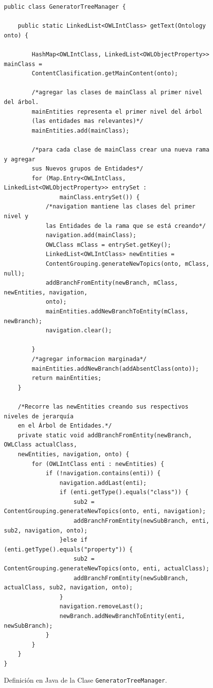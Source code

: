 \begin{figure}
\begin{verbatim}
public class GeneratorTreeManager {

    public static LinkedList<OWLIntClass> getText(Ontology onto) {

        HashMap<OWLIntClass, LinkedList<OWLObjectProperty>> mainClass =
        ContentClasification.getMainContent(onto);
        
        /*agregar las clases de mainClass al primer nivel del árbol. 
        mainEntities representa el primer nivel del árbol 
        (las entidades mas relevantes)*/
        mainEntities.add(mainClass);
        
        /*para cada clase de mainClass crear una nueva rama y agregar 
        sus Nuevos grupos de Entidades*/
        for (Map.Entry<OWLIntClass, LinkedList<OWLObjectProperty>> entrySet : 
                mainClass.entrySet()) {
            /*navigation mantiene las clases del primer nivel y
            las Entidades de la rama que se está creando*/
            navigation.add(mainClass);
            OWLClass mClass = entrySet.getKey();
            LinkedList<OWLIntClass> newEntities =
            ContentGrouping.generateNewTopics(onto, mClass, null);
            addBranchFromEntity(newBranch, mClass, newEntities, navigation,
            onto);
            mainEntities.addNewBranchToEntity(mClass, newBranch);
            navigation.clear();
            
        }
        /*agregar informacion marginada*/
        mainEntities.addNewBranch(addAbsentClass(onto));
        return mainEntities;
    }
    
    /*Recorre las newEntities creando sus respectivos niveles de jerarquía 
    en el Árbol de Entidades.*/
    private static void addBranchFromEntity(newBranch, OWLClass actualClass,
    newEntities, navigation, onto) {
        for (OWLIntClass enti : newEntities) {
            if (!navigation.contains(enti)) {
                navigation.addLast(enti);
                if (enti.getType().equals("class")) {
                    sub2 = ContentGrouping.generateNewTopics(onto, enti, navigation);
                    addBranchFromEntity(newSubBranch, enti, sub2, navigation, onto);
                }else if (enti.getType().equals("property")) {
                    sub2 = ContentGrouping.generateNewTopics(onto, enti, actualClass);
                    addBranchFromEntity(newSubBranch, actualClass, sub2, navigation, onto);
                }
                navigation.removeLast();
                newBranch.addNewBranchToEntity(enti, newSubBranch);
            }
        }
    }
}

\end{verbatim}
\caption{Definición en Java de la Clase \texttt{GeneratorTreeManager}.}
\label{fig:clase_generator_tree}
\end{figure}


